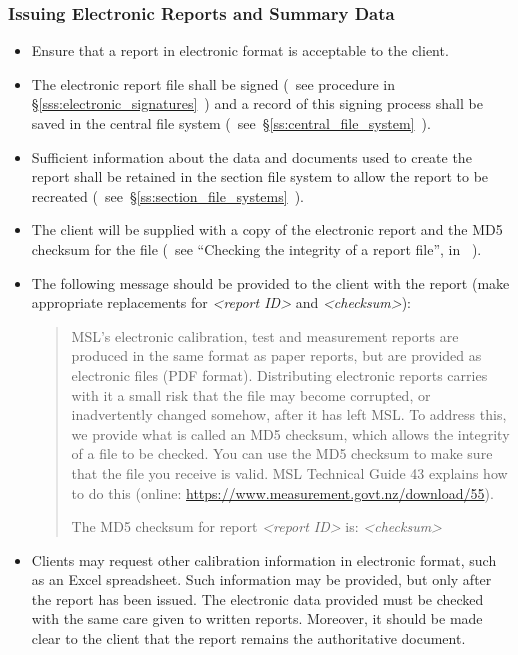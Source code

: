 \subsubsection{Issuing Electronic Reports and Summary Data}
\label{sss:issuing_electronic_reports}
\begin{itemize}

\item Ensure that a report in electronic format is acceptable to the client.

\item The electronic report file shall be signed (~see procedure in \S\ref{sss:electronic_signatures}~) and a record of this signing process shall be saved in the central file system (~see~\S\ref{ss:central_file_system}~). 

\item Sufficient information about the data and documents used to create the report shall be retained in the section file system to allow the report to be recreated (~see~\S\ref{ss:section_file_systems}~). 
   
\item The client will be supplied with a copy of the electronic report and the MD5 checksum for the file (~see ``Checking the integrity of a report file'', in \cite[\S\ref*{GRP-ss:file_integrity_md5}]{MSL_Reporting_Guidelines}~).

\item The following message should be provided to the client with the report (make appropriate replacements for \textit{<report ID>} and  \textit{<checksum>}):
\begin{quote}
MSL's electronic calibration, test and measurement reports are produced in the same format as paper reports, but are provided as electronic files (PDF format). Distributing electronic reports carries with it a small risk that the file may become corrupted, or inadvertently changed somehow, after it has left MSL. To address this, we provide what is called an MD5 checksum, which allows the integrity of a file to be checked. You can use the MD5 checksum to make sure that the file you receive is valid. MSL Technical Guide 43 explains how to do this (online: \url{https://www.measurement.govt.nz/download/55}).

\vspace{\baselineskip}
The MD5 checksum for report \textit{<report ID>} is:   \textit{<checksum>} 
\end{quote}

\item Clients may request other calibration information in electronic format, such as an Excel spreadsheet. Such information may be provided, but only after the report has been issued. The electronic data provided must be checked with the same care given to written reports. Moreover, it should be made clear to the client that the report remains the authoritative document. 

\end{itemize}


